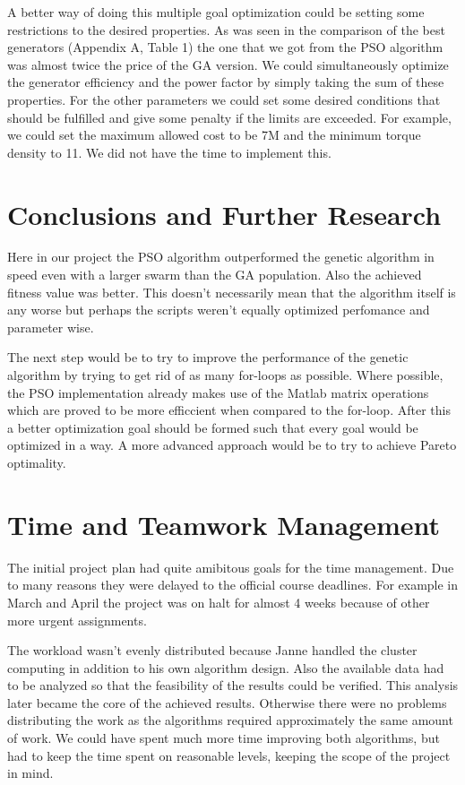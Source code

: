 \documentclass[twoside]{article}
\begin{document}
\begin{multicols}{2}
A better way of doing this multiple goal optimization could be setting some restrictions to the desired properties. As was seen in the comparison of the best generators (Appendix A, Table 1) the one that we got from the PSO algorithm was almost twice the price of the GA version. We could simultaneously optimize the generator efficiency and the power factor by simply taking the sum of these properties. For the other parameters we could set some desired conditions that should be fulfilled and give some penalty if the limits are exceeded. For example, we could set the maximum allowed cost to be 7M and the minimum torque density to 11. We did not have the time to implement this.



\section{Conclusions and Further Research}

Here in our project the PSO algorithm outperformed the genetic algorithm in speed even with a larger swarm than the GA population. Also the achieved fitness value was better. This doesn't necessarily mean that the algorithm itself is any worse but perhaps the scripts weren't equally optimized perfomance and parameter wise.

The next step would be to try to improve the performance of the genetic algorithm by trying to get rid of as many for-loops as possible. Where possible, the PSO implementation already makes use of the Matlab matrix operations which are proved to be more efficcient when compared to the for-loop. After this a better optimization goal should be formed such that every goal would be optimized in a way. A more advanced approach would be to try to achieve Pareto optimality.

\section{Time and Teamwork Management}
The initial project plan had quite amibitous goals for the time management. Due to many reasons they were delayed to the official course deadlines. For example in March and April the project was on halt for almost 4 weeks because of other more urgent assignments.

The workload wasn't evenly distributed because Janne handled the cluster computing in addition to his own algorithm design. Also the available data had to be analyzed so that the feasibility of the results could be verified. This analysis later became the core of the achieved results. Otherwise there were no problems distributing the work as the algorithms required approximately the same amount of work. We could have spent much more time improving both algorithms, but had to keep the time spent on reasonable levels, keeping the scope of the project in mind.


\end{multicols}
\end{document}
